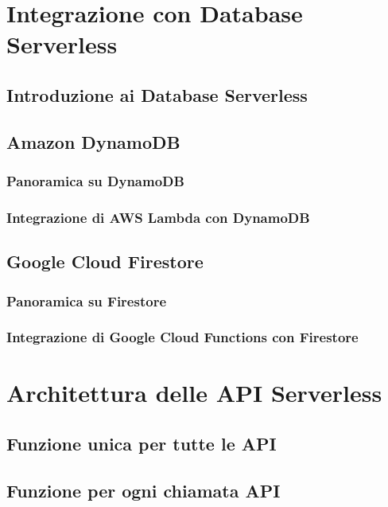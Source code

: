 \documentclass[12pt,a4paper,twoside]{book}
\begin{document}
\chapter{Integrazione con Database Serverless}
\section{Introduzione ai Database Serverless}


\section{Amazon DynamoDB}
\subsection{Panoramica su DynamoDB}


\subsection{Integrazione di AWS Lambda con DynamoDB}


\section{Google Cloud Firestore}
\subsection{Panoramica su Firestore}


\subsection{Integrazione di Google Cloud Functions con Firestore}


\chapter{Architettura delle API Serverless}


\section{Funzione unica per tutte le API}


\section{Funzione per ogni chiamata API}

\end{document}
